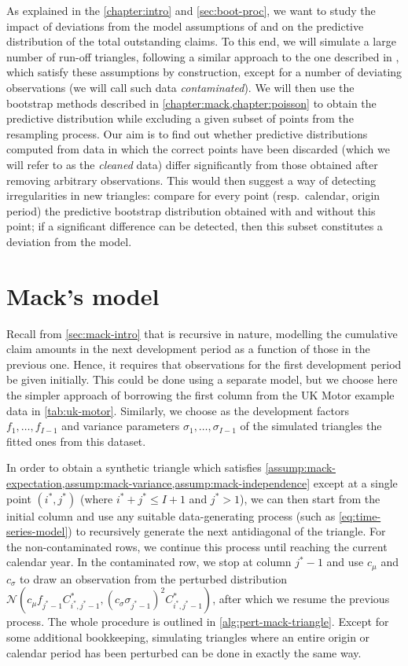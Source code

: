 \documentclass[a4paper]{book}
\begin{document}
As explained in the \cref{chapter:intro} and \cref{sec:boot-proc}, we want to study the impact of deviations from the model assumptions of  and  on the predictive distribution of the total outstanding claims. To this end, we will simulate a large number of run-off triangles, following a similar approach to the one described in \cite{schiegl}, which satisfy these assumptions by construction, except for a number of deviating observations (we will call such data \emph{contaminated}). We will then use the bootstrap methods described in \cref{chapter:mack,chapter:poisson} to obtain the predictive distribution while excluding a given subset of points from the resampling process. Our aim is to find out whether predictive distributions computed from data in which the correct points have been discarded (which we will refer to as the \emph{cleaned} data) differ significantly from those obtained after removing arbitrary observations. This would then suggest a way of detecting irregularities in new triangles: compare for every point (resp.\ calendar, origin period) the predictive bootstrap distribution obtained with and without this point; if a significant difference can be detected, then this subset constitutes a deviation from the model.


\section{Mack's model} \label{sec:mack-sim}

Recall from \cref{sec:mack-intro} that  is recursive in nature, modelling the cumulative claim amounts in the next development period as a function of those in the previous one. Hence, it requires that observations for the first development period be given initially. This could be done using a separate model, but we choose here the simpler approach of borrowing the first column from the UK Motor example data in \cref{tab:uk-motor}. Similarly, we choose as the development factors $f_1, \dots, f_{I - 1}$ and variance parameters $\sigma_1, \dots, \sigma_{I - 1}$ of the simulated triangles the fitted ones from this dataset.

In order to obtain a synthetic triangle which satisfies \cref{assump:mack-expectation,assump:mack-variance,assump:mack-independence} except at a single point $(i^*, j^*)$ (where $i^* + j^* \leq I + 1$ and $j^* > 1$), we can then start from the initial column and use any suitable data-generating process (such as \cref{eq:time-series-model}) to recursively generate the next antidiagonal of the triangle. For the non-contaminated rows, we continue this process until reaching the current calendar year. In the contaminated row, we stop at column $j^* - 1$ and use $c_\mu$ and $c_\sigma$ to draw an observation from the perturbed distribution $\mathcal{N}(c_\mu f_{j^* - 1} C^*_{i^*, j^* - 1}, (c_\sigma \sigma_{j^* - 1})^2 C^*_{i^*, j^* - 1})$, after which we resume the previous process. The whole procedure is outlined in \cref{alg:pert-mack-triangle}. Except for some additional bookkeeping, simulating triangles where an entire origin or calendar period has been perturbed can be done in exactly the same way.
\end{document}
